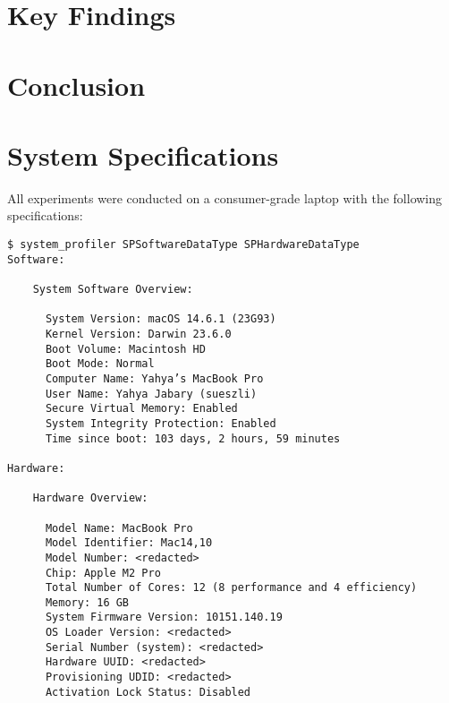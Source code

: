 \documentclass[manuscript]{acmart}
\begin{document}
\section{Key Findings}


\section{Conclusion}









\appendix

\section{System Specifications}

All experiments were conducted on a consumer-grade laptop with the following specifications:

\begin{footnotesize}
\begin{verbatim}
$ system_profiler SPSoftwareDataType SPHardwareDataType
Software:

    System Software Overview:

      System Version: macOS 14.6.1 (23G93)
      Kernel Version: Darwin 23.6.0
      Boot Volume: Macintosh HD
      Boot Mode: Normal
      Computer Name: Yahya’s MacBook Pro
      User Name: Yahya Jabary (sueszli)
      Secure Virtual Memory: Enabled
      System Integrity Protection: Enabled
      Time since boot: 103 days, 2 hours, 59 minutes

Hardware:

    Hardware Overview:

      Model Name: MacBook Pro
      Model Identifier: Mac14,10
      Model Number: <redacted>
      Chip: Apple M2 Pro
      Total Number of Cores: 12 (8 performance and 4 efficiency)
      Memory: 16 GB
      System Firmware Version: 10151.140.19
      OS Loader Version: <redacted>
      Serial Number (system): <redacted>
      Hardware UUID: <redacted>
      Provisioning UDID: <redacted>
      Activation Lock Status: Disabled
\end{verbatim}
\end{footnotesize}
\end{document}
